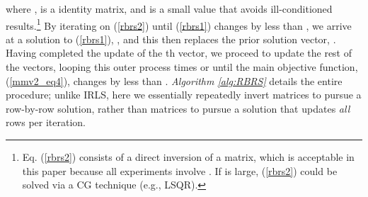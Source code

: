 \documentclass[final]{siamltex}
\begin{document}
    where ,  is a  identity matrix,
    and  is a small value that avoids ill-conditioned
    results.\footnote{Eq. (\ref{rbrs2}) consists of a direct inversion
    of a  matrix, which is acceptable in this paper
    because all experiments involve .  If  is large,
    (\ref{rbrs2}) could be solved via a CG technique
    (e.g., LSQR).}  By iterating on (\ref{rbrs2}) until (\ref{rbrs1})
    changes by less than , we arrive at a
    solution to (\ref{rbrs1}), , and this then
    replaces the prior solution vector, .  Having completed
    the update of the th vector, we proceed to update the rest of
    the vectors, looping this outer process  times or until the
    main objective function, (\ref{mmv2_eq4}), changes by less than
    .  {\em{Algorithm \ref{alg:RBRS}}} details
    the entire procedure; unlike IRLS, here we essentially repeatedly
    invert  matrices to pursue a row-by-row solution,
    rather than  matrices to pursue a solution that
    updates {\em{all}} rows per iteration.
\end{document}
